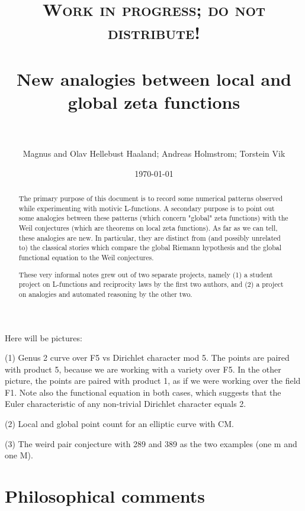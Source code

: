 \documentclass[paper=a4, fontsize=11pt]{scrartcl} %
\title{
\normalfont \normalsize
\textsc{Work in progress; do not distribute!} \\ [25pt] %
\horrule{0.5pt} \\[0.4cm] %
\LARGE New analogies between local and global zeta functions \\ %
\horrule{2pt} \\[0.5cm] %
}
\author{Magnus and Olav Hellebust Haaland; Andreas Holmstrom; Torstein Vik} %
\date{\normalsize\today} %
\numberwithin{equation}{section} %
\numberwithin{figure}{section} %
\numberwithin{table}{section} %
\begin{document}
\maketitle %


\begin{abstract}

The primary purpose of this document is to record some numerical patterns observed while experimenting with motivic L-functions. A secondary purpose is to point out some analogies between these patterns (which concern "global" zeta functions) with the Weil conjectures (which are theorems on local zeta functions). As far as we can tell, these analogies are new. In particular, they are distinct from (and possibly unrelated to) the classical stories which compare the global Riemann hypothesis and the global functional equation to the Weil conjectures.

These very informal notes grew out of two separate projects, namely (1) a student project on L-functions and reciprocity laws by the first two authors, and (2) a project on analogies and automated reasoning by the other two.


\end{abstract}


\newpage

Here will be pictures:

(1) Genus 2 curve over F5 vs Dirichlet character mod 5. The points are paired with product 5, because we are working with a variety over F5. In the other picture, the points are paired with product 1, as if we were working over the field F1. Note also the functional equation in both cases, which suggests that the Euler characteristic of any non-trivial Dirichlet character equals 2.

(2) Local and global point count for an elliptic curve with CM.

(3) The weird pair conjecture with 289 and 389 as the two examples (one m and one M).


\newpage

\tableofcontents


\newpage

\section{Philosophical comments}
\end{document}
